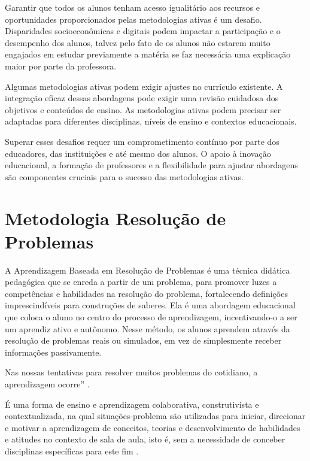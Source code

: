 Garantir que todos os alunos tenham acesso igualitário aos recursos e oportunidades proporcionados pelas metodologias ativas é um desafio. Disparidades socioeconômicas e digitais podem impactar a participação e o desempenho dos alunos, talvez pelo fato de os alunos não estarem muito engajados em estudar previamente a matéria se faz necessária uma explicação maior por parte da professora.

Algumas metodologias ativas podem exigir ajustes no currículo existente. A integração eficaz dessas abordagens pode exigir uma revisão cuidadosa dos objetivos e conteúdos de ensino. As metodologias ativas podem precisar ser adaptadas para diferentes disciplinas, níveis de ensino e contextos educacionais.

Superar esses desafios requer um comprometimento contínuo por parte dos educadores, das instituições e até mesmo dos alunos. O apoio à inovação educacional, a formação de professores e a flexibilidade para ajustar abordagens são componentes cruciais para o sucesso das metodologias ativas.

\section{Metodologia Resolução de Problemas} \label{sec:2.4_ResolucaoProblemas}

A Aprendizagem Baseada em Resolução de Problemas é uma técnica didática pedagógica que se enreda a partir de um problema, para promover luzes a competências e habilidades na resolução do problema, fortalecendo definições imprescindíveis para construções de saberes. Ela é uma abordagem educacional que coloca o aluno no centro do processo de aprendizagem, incentivando-o a ser um aprendiz ativo e autônomo. Nesse método, os alunos aprendem através da resolução de problemas reais ou simulados, em vez de simplesmente receber informações passivamente.

Nas nossas tentativas para resolver muitos problemas do cotidiano, a aprendizagem ocorre'' \cite[p. 55]{SOUZA2016}.

\begin{citacao}
    É uma forma de ensino e aprendizagem colaborativa, construtivista e contextualizada, na qual situações-problema são utilizadas para iniciar, direcionar e motivar a aprendizagem de conceitos, teorias e desenvolvimento de habilidades e atitudes no contexto de sala de aula, isto é, sem a necessidade de conceber disciplinas específicas para este fim \cite[p. 48]{SOUZA2016}.
\end{citacao}

